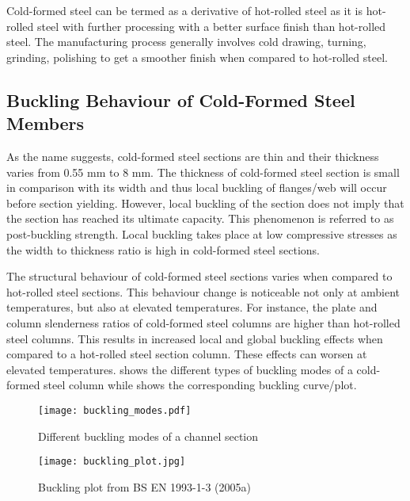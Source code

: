 Cold-formed steel can be termed as a derivative of hot-rolled steel as it is hot-rolled steel with further processing with a better surface finish than hot-rolled steel. The manufacturing process generally involves cold drawing, turning, grinding, polishing to get a smoother finish when compared to hot-rolled steel.

\subsection{Buckling Behaviour of Cold-Formed Steel Members}

As the name suggests, cold-formed steel sections are thin and their thickness varies from 0.55 mm to 8 mm. The thickness of cold-formed steel section is small in comparison with its width and thus local buckling of flanges/web will occur before section yielding. However, local buckling of the section does not imply that the section has reached its ultimate capacity. This phenomenon is referred to as post-buckling strength. Local buckling takes place at low compressive stresses as the width to thickness ratio is high in cold-formed steel sections.

The structural behaviour of cold-formed steel sections varies when compared to hot-rolled steel sections. This behaviour change is noticeable not only at ambient temperatures, but also at elevated temperatures. For instance, the plate and column slenderness ratios of cold-formed steel columns are higher than hot-rolled steel columns. This results in increased local and global buckling effects when compared to a hot-rolled steel section column. These effects can worsen at elevated temperatures.  shows the different types of buckling modes of a cold-formed steel column while  shows the corresponding buckling curve/plot. 

\begin{figure}[htbp]
	\begin{center}	
		\texttt{[image: buckling\_modes.pdf]}
		\caption{Different buckling modes of a channel section}
		\label{fig:buckling_modes}
	\end{center}
\end{figure}
\begin{figure}[htbp]
	\begin{center}	
		\texttt{[image: buckling\_plot.jpg]}
		\caption{Buckling plot from BS EN 1993-1-3 (2005a)}
		\label{fig:buckling_plot}
	\end{center}
\end{figure}

